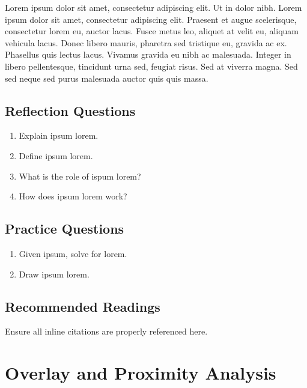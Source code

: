 \documentclass[
]{book}
\providecommand{\tightlist}{%
  \setlength{\itemsep}{0pt}\setlength{\parskip}{0pt}}
\begin{document}
Lorem ipsum dolor sit amet, consectetur adipiscing elit. Ut in dolor nibh. Lorem ipsum dolor sit amet, consectetur adipiscing elit. Praesent et augue scelerisque, consectetur lorem eu, auctor lacus. Fusce metus leo, aliquet at velit eu, aliquam vehicula lacus. Donec libero mauris, pharetra sed tristique eu, gravida ac ex. Phasellus quis lectus lacus. Vivamus gravida eu nibh ac malesuada. Integer in libero pellentesque, tincidunt urna sed, feugiat risus. Sed at viverra magna. Sed sed neque sed purus malesuada auctor quis quis massa.

\hypertarget{reflection-questions-3}{%
\section*{Reflection Questions}\label{reflection-questions-3}}

\begin{enumerate}
\def\labelenumi{\arabic{enumi}.}
\tightlist
\item
  Explain ipsum lorem.
\item
  Define ipsum lorem.
\item
  What is the role of ispum lorem?
\item
  How does ipsum lorem work?
\end{enumerate}

\hypertarget{practice-questions-3}{%
\section*{Practice Questions}\label{practice-questions-3}}

\begin{enumerate}
\def\labelenumi{\arabic{enumi}.}
\setcounter{enumi}{1}
\tightlist
\item
  Given ipsum, solve for lorem.
\item
  Draw ipsum lorem.
\end{enumerate}

\hypertarget{recommended-readings-1}{%
\section*{Recommended Readings}\label{recommended-readings-1}}

Ensure all inline citations are properly referenced here.

\hypertarget{overlay-and-proximity-analysis}{%
\chapter{Overlay and Proximity Analysis}\label{overlay-and-proximity-analysis}}
\end{document}
